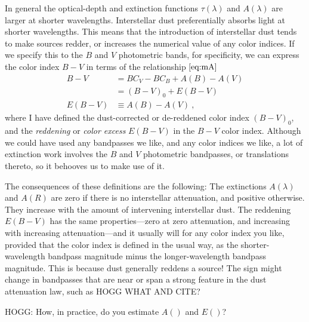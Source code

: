\documentclass[10pt]{article}
\begin{document}
In general the optical-depth and extinction functions $\tau(\lambda)$ and $A(\lambda)$ are larger at shorter wavelengths.
Interstellar dust preferentially absorbs light at shorter wavelengths.
This means that the introduction of interstellar dust tends to make sources redder, or increases the numerical value of any color indices.
If we specify this to the $B$ and $V$ photometric bands, for specificity, we can express the color index $B-V$ in terms of the relationship $\eqref{eq:mA}$
\begin{align}
    B - V &= BC_V - BC_B + A(B) - A(V)\\
          &= (B - V)_0 + E(B - V)\\
    E(B - V) &\equiv A(B) - A(V) ~,
\end{align}
where I have defined the dust-corrected or de-reddened color index $(B-V)_0$,
and the \emph{reddening} or \emph{color excess} $E(B-V)$ in the $B-V$ color index.
Although we could have used any bandpasses we like, and any color indices we like,
a lot of extinction work involves the $B$ and $V$ photometric bandpasses, or translations thereto, so it behooves us to make use of it.

The consequences of these definitions are the following:
The extinctions $A(\lambda)$ and $A(R)$ are zero if there is no interstellar attenuation, and positive otherwise.
They increase with the amount of intervening interstellar dust.
The reddening $E(B-V)$ has the same properties---zero at zero attenuation, and increasing with increasing attenuation---and it usually will for any color index you like, provided that the color index is defined in the usual way, as the shorter-wavelength bandpass magnitude minus the longer-wavelength bandpass magnitude.
This is because dust generally reddens a source!
The sign might change in bandpasses that are near or span a strong feature in the dust attenuation law, such as HOGG WHAT AND CITE?

HOGG: How, in practice, do you estimate $A()$ and $E()$?
\end{document}
